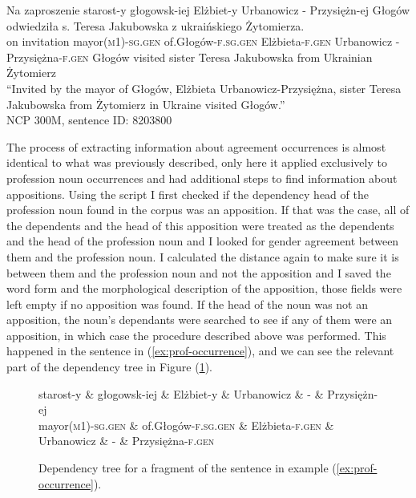\begin{exe}
  \gll Na zaproszenie starost-y głogowsk-iej Elżbiet-y Urbanowicz - Przysiężn-ej Głogów odwiedziła s. Teresa Jakubowska z ukraińskiego Żytomierza.\\
  on invitation mayor\textsc{(m1)-sg.gen} of.Głogów\textsc{-f.sg.gen} Elżbieta\textsc{-f.gen} Urbanowicz - Przysiężna\textsc{-f.gen} Głogów visited sister Teresa Jakubowska from Ukrainian Żytomierz\\
  \glt ``Invited by the mayor of Głogów, Elżbieta Urbanowicz-Przysiężna, sister Teresa Jakubowska from Żytomierz in Ukraine visited Głogów.''\\
  NCP 300M, sentence ID: 8203800
\end{exe}

The process of extracting information about agreement occurrences is almost identical to what was previously described, only here it applied exclusively to profession noun occurrences and had additional steps to find information about appositions. Using the script I first checked if the dependency head of the profession noun found in the corpus was an apposition. If that was the case, all of the dependents and the head of this apposition were treated as the dependents and the head of the profession noun and I looked for gender agreement between them and the profession noun. I calculated the distance again to make sure it is between them and the profession noun and not the apposition and I saved the word form and the morphological description of the apposition, those fields were left empty if no apposition was found. If the head of the noun was not an apposition, the noun's dependants were searched to see if any of them were an apposition, in which case the procedure described above was performed. This happened in the sentence in (\ref{ex:prof-occurrence}), and we can see the relevant part of the dependency tree in Figure (\ref{starosta-tree}).

\begin{figure}[h]
  \centering
  \begin{dependency}
    \begin{deptext}
      starost-y \& głogowsk-iej \& Elżbiet-y \& Urbanowicz \& - \& Przysiężn-ej\\
      mayor\textsc{(m1)-sg.gen} \& of.Głogów\textsc{-f.sg.gen} \& Elżbieta\textsc{-f.gen} \& Urbanowicz \& - \& Przysiężna\textsc{-f.gen}\\
    \end{deptext}
  \end{dependency}
  \caption*{``mayor of Głogów Elżbieta Urbanowicz-Przysiężna''}
  \caption{Dependency tree for a fragment of the sentence in example (\ref{ex:prof-occurrence}).}
  \label{starosta-tree}
\end{figure}

